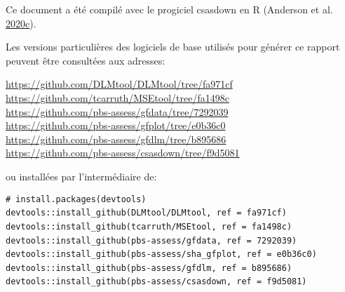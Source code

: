\documentclass[11pt]{book}
\begin{document}
Ce document a été compilé avec le progiciel csasdown en R (Anderson et al. \protect\hyperlink{ref-csasdown}{2020}\protect\hyperlink{ref-csasdown}{c}).

Les versions particulières des logiciels de base utilisés pour générer ce rapport peuvent être consultées aux adresses:

\url{https://github.com/DLMtool/DLMtool/tree/fa971cf}\\
\url{https://github.com/tcarruth/MSEtool/tree/fa1498c}~\\
\url{https://github.com/pbs-assess/gfdata/tree/7292039}~\\
\url{https://github.com/pbs-assess/gfplot/tree/e0b36c0}~\\
\url{https://github.com/pbs-assess/gfdlm/tree/b895686}~\\
\url{https://github.com/pbs-assess/csasdown/tree/f9d5081}~\\

\vspace{4mm}

ou installées par l'intermédiaire de:

\texttt{\#\ install.packages(\textquotesingle{}devtools\textquotesingle{})}\\
\texttt{devtools::install\_github(\textquotesingle{}DLMtool/DLMtool\textquotesingle{},\ ref\ =\ \textquotesingle{}fa971cf\textquotesingle{})}~\\
\texttt{devtools::install\_github(\textquotesingle{}tcarruth/MSEtool\textquotesingle{},\ ref\ =\ \textquotesingle{}fa1498c\textquotesingle{})}~\\
\texttt{devtools::install\_github(\textquotesingle{}pbs-assess/gfdata\textquotesingle{},\ ref\ =\ \textquotesingle{}7292039\textquotesingle{})}~\\
\texttt{devtools::install\_github(\textquotesingle{}pbs-assess/sha\_gfplot\textquotesingle{},\ ref\ =\ \textquotesingle{}e0b36c0\textquotesingle{})}~\\
\texttt{devtools::install\_github(\textquotesingle{}pbs-assess/gfdlm\textquotesingle{},\ ref\ =\ \textquotesingle{}b895686\textquotesingle{})}~\\
\texttt{devtools::install\_github(\textquotesingle{}pbs-assess/csasdown\textquotesingle{},\ ref\ =\ \textquotesingle{}f9d5081\textquotesingle{})}~\\

\clearpage
\end{document}
